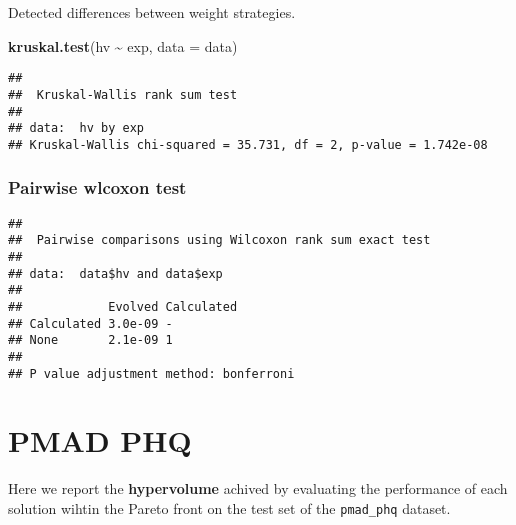 \documentclass[
]{book}
\newenvironment{Shaded}{\begin{snugshade}}{\end{snugshade}}
\newcommand{\AttributeTok}[1]{\textcolor[rgb]{0.13,0.29,0.53}{#1}}
\newcommand{\ConstantTok}[1]{\textcolor[rgb]{0.56,0.35,0.01}{#1}}
\newcommand{\FunctionTok}[1]{\textcolor[rgb]{0.13,0.29,0.53}{\textbf{#1}}}
\newcommand{\NormalTok}[1]{#1}
\newcommand{\SpecialCharTok}[1]{\textcolor[rgb]{0.81,0.36,0.00}{\textbf{#1}}}
\newcommand{\StringTok}[1]{\textcolor[rgb]{0.31,0.60,0.02}{#1}}
\begin{document}
Detected differences between weight strategies.

\begin{Shaded}
\begin{Highlighting}[]
\FunctionTok{kruskal.test}\NormalTok{(hv }\SpecialCharTok{\textasciitilde{}}\NormalTok{ exp, }\AttributeTok{data =}\NormalTok{ data)}
\end{Highlighting}
\end{Shaded}

\begin{verbatim}
## 
##  Kruskal-Wallis rank sum test
## 
## data:  hv by exp
## Kruskal-Wallis chi-squared = 35.731, df = 2, p-value = 1.742e-08
\end{verbatim}

\hypertarget{pairwise-wlcoxon-test-10}{%
\subsection{Pairwise wlcoxon test}\label{pairwise-wlcoxon-test-10}}

\begin{Shaded}
\end{Shaded}

\begin{verbatim}
## 
##  Pairwise comparisons using Wilcoxon rank sum exact test 
## 
## data:  data$hv and data$exp 
## 
##            Evolved Calculated
## Calculated 3.0e-09 -         
## None       2.1e-09 1         
## 
## P value adjustment method: bonferroni
\end{verbatim}

\hypertarget{pmad-phq}{%
\chapter{PMAD PHQ}\label{pmad-phq}}

Here we report the \textbf{hypervolume} achived by evaluating the performance of each solution wihtin the Pareto front on the test set of the \texttt{pmad\_phq} dataset.
\end{document}
